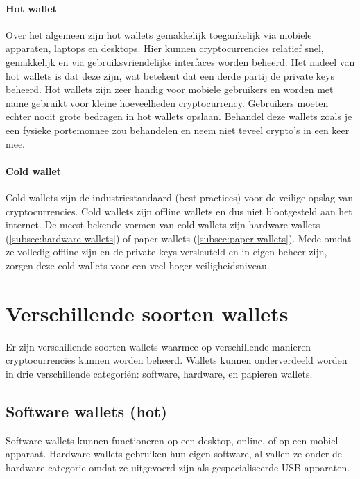 \paragraph{Hot wallet}
Over het algemeen zijn hot wallets gemakkelijk toegankelijk via mobiele apparaten, laptops en desktops. Hier kunnen cryptocurrencies relatief snel, gemakkelijk en via gebruiksvriendelijke interfaces worden beheerd. Het nadeel van hot wallets is dat deze  zijn, wat betekent dat een derde partij de private keys beheerd. Hot wallets zijn zeer handig voor mobiele gebruikers en worden met name gebruikt voor kleine hoeveelheden cryptocurrency. Gebruikers moeten echter nooit grote bedragen in hot wallets opslaan. Behandel deze wallets zoals je een fysieke portemonnee zou behandelen en neem niet teveel crypto's in een keer mee. 
\paragraph{Cold wallet}
Cold wallets zijn de industriestandaard (best practices) voor de veilige opslag van cryptocurrencies. Cold wallets zijn offline wallets en dus niet blootgesteld aan het internet. De meest bekende vormen van cold wallets zijn hardware wallets (\cref{subsec:hardware-wallets}) of paper wallets (\cref{subsec:paper-wallets}). Mede omdat ze volledig offline zijn en de private keys versleuteld en in eigen beheer zijn, zorgen deze cold wallets voor een veel hoger veiligheidsniveau.

\medskip

\section{Verschillende soorten wallets}
Er zijn verschillende soorten wallets waarmee op verschillende manieren cryptocurrencies kunnen worden beheerd. Wallets kunnen onderverdeeld worden in drie verschillende categori{\"e}n: software, hardware, en papieren wallets. 

\medskip

\subsection[Software wallets] {Software wallets (hot)}
Software wallets kunnen functioneren op een desktop, online, of op een mobiel apparaat. Hardware wallets gebruiken hun eigen software, al vallen ze onder de hardware categorie omdat ze uitgevoerd zijn als gespecialiseerde USB-apparaten.

